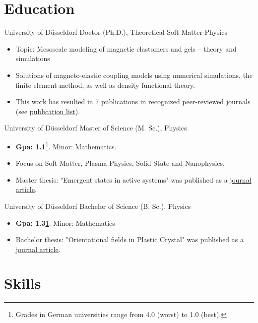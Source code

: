 \documentclass[singlesided,
               paper=a4,
               fontsize=10pt
              ]{my-resume}
\begin{document}
\section[\faMortarBoard]{Education}
    {University of Düsseldorf}
    {Doctor (Ph.D.), Theoretical Soft Matter Physics}
    {
        \begin{itemize}
            \item Topic: Mesoscale modeling of magnetic elastomers and gels -- theory and simulations
            \item Solutions of magneto-elastic coupling models using numerical simulations, the finite element method, as well as density functional theory. 
            \item This work has resulted in 7 publications in recognized peer-reviewed journals (see \href{https://scholar.google.com/citations?hl=de&user=MnU8ZxwAAAAJ}{publication list}).
        \end{itemize}
    }
    {University of Düsseldorf}
    {Master of Science (M. Sc.), Physics}
    {
        \begin{itemize}
            \item \textbf{Gpa: 1.1}\footnote{\label{footnote1}Grades in German universities range from 4.0 (worst) to 1.0 (best).}. Minor: Mathematics.
            \item Focus on Soft Matter, Plasma Physics, Solid-State and Nanophysics.
            \item Master thesis: "Emergent states in active systems" was published as a \href{https://journals.aps.org/pre/abstract/10.1103/PhysRevE.89.022307}{journal article}.
        \end{itemize}
    }
    {University of Düsseldorf}
    {Bachelor of Science (B. Sc.), Physics}
    {
        \begin{itemize}
            \item \textbf{Gpa: 1.3}\cref{footnote1}. Minor: Mathematics
            \item Bachelor thesis: "Orientational fields in Plastic Crystal" was published as a \href{https://epljournal.edpsciences.org/articles/epl/abs/2012/15/epl14756/epl14756.html}{journal article}.
        \end{itemize}
    }

\section[\faFlask]{Skills}
\end{document}
